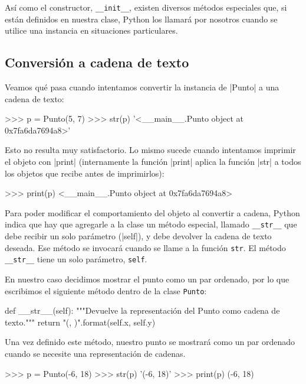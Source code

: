 Así como el constructor, \lstinline!__init__!, existen diversos métodos
especiales que, si están definidos en nuestra clase, Python los llamará por
nosotros cuando se utilice una instancia en situaciones particulares.

\subsection{Conversión a cadena de texto}

Veamos qué pasa cuando intentamos convertir la instancia de |Punto| a una
cadena de texto:

\begin{codigo-python-sn}
>>> p = Punto(5, 7)
>>> str(p)
'<__main__.Punto object at 0x7fa6da7694a8>'
\end{codigo-python-sn}

Esto no resulta muy satisfactorio. Lo mismo sucede cuando intentamos imprimir
el objeto con |print| (internamente la función |print| aplica la función |str|
a todos los objetos que recibe antes de imprimirlos):

\begin{codigo-python-sn}
>>> print(p)
<__main__.Punto object at 0x7fa6da7694a8>
\end{codigo-python-sn}

Para poder modificar el comportamiento del objeto al convertir a cadena, Python
indica que hay que agregarle a la clase un método especial, llamado
\lstinline+__str__+ que debe recibir un solo parámetro (|self|), y
debe devolver la cadena de texto deseada.  Ese método
se invocará cuando se llame a la función \lstinline!str!.
El método \lstinline+__str__+ tiene un solo parámetro, \lstinline!self!.

En nuestro caso decidimos mostrar el punto como un par ordenado, por lo que
escribimos el siguiente método dentro de la clase \lstinline!Punto!:

\begin{codigo-python-sn}
    def __str__(self):
        """Devuelve la representación del Punto como
           cadena de texto."""
        return "({}, {})".format(self.x, self.y)
\end{codigo-python-sn}

Una vez definido este método, nuestro punto se mostrará como un par
ordenado cuando se necesite una representación de cadenas.

\begin{codigo-python-sn}
>>> p = Punto(-6, 18)
>>> str(p)
'(-6, 18)'
>>> print(p)
(-6, 18)
\end{codigo-python-sn}

